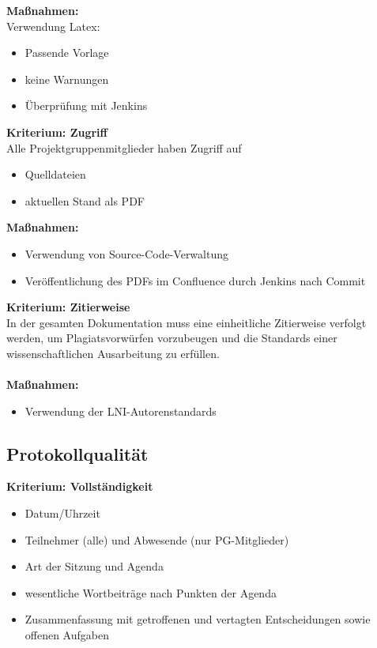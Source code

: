 \textbf{Maßnahmen: }\\
Verwendung Latex:
\begin{itemize}
\item	Passende Vorlage
\item	keine Warnungen
\item	Überprüfung mit Jenkins
\end{itemize}

\textbf{Kriterium: Zugriff}\\
Alle Projektgruppenmitglieder haben Zugriff auf
\begin{itemize}
\item	Quelldateien
\item	aktuellen Stand als PDF
\end{itemize}

\textbf{Maßnahmen: }
\begin{itemize}
\item	Verwendung von Source-Code-Verwaltung
\item	Veröffentlichung des PDFs im Confluence durch Jenkins nach Commit
\end{itemize}

\textbf{Kriterium: Zitierweise}\\
In der gesamten Dokumentation muss eine einheitliche Zitierweise verfolgt werden, um Plagiatsvorwürfen vorzubeugen und die Standards einer wissenschaftlichen Ausarbeitung zu erfüllen.\\
\\
\textbf{Maßnahmen: }
\begin{itemize}
\item	Verwendung der LNI-Autorenstandards
\end{itemize}

\subsection{Protokollqualität}
\textbf{Kriterium: Vollständigkeit}
\begin{itemize}
\item	Datum/Uhrzeit
\item	Teilnehmer (alle) und Abwesende (nur PG-Mitglieder)
\item	Art der Sitzung und Agenda
\item	wesentliche Wortbeiträge nach Punkten der Agenda
\item	Zusammenfassung mit getroffenen und vertagten Entscheidungen sowie offenen Aufgaben
\end{itemize}

